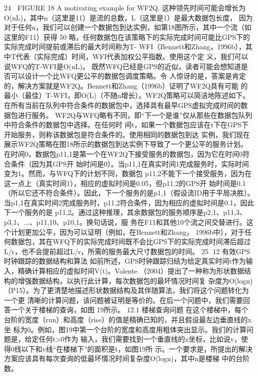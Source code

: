                                                                   24
                     FIGURE 18 A motivating example for WF2Q.
这种领先时间可能会增长为O(nL)，其中n（这里是11）是流的总数，L（这里是1）是最大数据包长度，
因为对于任何n，我们可以创建一个数据包到达实例，如第18图所示，其中一个流（如这里的F11）获得
50%
略，任何数据包在该策略下的实际完成时间可能比GPS下的实际完成时间提前或滞后的最大时间称为T-
WFI（Bennett和Zhang，1996b），其中T代表（实际完成）时间，WFI代表加权公平指数。使用这个定
义，我们可以说WFQ的T-WFI是O(nL)。
既然WFQ已经是GPS的近似，读者可能会想知道是否可以设计一个比WFQ更公平的数据包调度策略。令
人惊讶的是，答案是肯定的，解决方案就是WF2Q。Bennett和Zhang（1996b）证明了WF2Q具有可能
的最小（最佳）T-WFI，即O(L)（不随n增长）。WF2Q策略可以简洁地陈述如下。
在所有当前在队列中符合条件的数据包中，选择具有最早GPS虚拟完成时间的数据包进行服务。
WF2Q与WFQ略有不同，即“下一个是谁”仅从那些在数据包队列中符合条件的数据包中选择。在任何时
间t，如果一个数据包应该在t下在GPS下开始服务，则称该数据包是符合条件的。使用相同的数据包到达
实例，我们现在展示WF2Q策略在图18所示的数据包到达实例下导致了一个更公平的服务计划。
在时间0，数据包p11,1是第一个在WF2Q下接受服务的数据包，因为它在时间0符合条件（因为其GPS开
始时间是0）。当p11,1在真实时间1完成服务时，实际时间变为1。然而，与WFQ下的计划不同，数据包
p11,2不能下一个接受服务，因为在这一点上（真实时间1），相应的虚拟时间是0.05，但p11,2的GPS开
始时间是0.1（所以它还不符合条件）。因此，下一个服务的是p1,1（假设流ID用于平局决胜）。
当p1,1在真实时间2完成服务时，p11,2符合条件，因为相应的虚拟时间是0.1，因此下一个服务的是
p11,2。通过这种推理，其余数据包的服务顺序是p2,1、p11,3、p3,1、...、p11,10、p10,1。换句话说，服
务在F11和其他10个流之间交替进行。这个计划更加公平，因为可以证明（例如，在Bennett和Zhang，
1996b中），对于任何数据包，其在WFQ下的实际完成时间既不会比GPS下的实际完成时间滞后超过
L/r，也不会提前超过L/r，所需的服务最大尺寸数据包的时间。
                                                             25
12 有效GPS时钟跟踪的数据结构和算法
如前所述，GPS时钟跟踪归结为给定真实时间t作为输入，精确计算相应的虚拟时间V(t)。Valente
（2004）提出了一种称为形状数据结构的增强数据结构，以执行此计算，每次数据包的最坏情况时间复
杂度为O(logn)（P15）。为了更清楚地描述形状数据结构及其伴随算法，我们将这个问题转化为一个更
清晰的计算问题，该问题被证明是等价的。在后一个问题中，我们需要回答一个关于楼梯的查询，如图
19所示。
12.1 楼梯查询问题
在这个楼梯中，每个台阶的宽度（run）和高度（rise）的值是精确已知的，并且假设最左边垂直线的x坐
标为0。例如，图19中第一个台阶的宽度和高度用粗体突出显示。我们的计算问题是，给定任何t>0作为
输入，我们需要找到一个垂直线的x坐标，比如说v，使得0线以下和v线“在楼梯下”的面积是t，如图19所
示。一个要求是，所提出的解决方案应该具有每次查询的低最坏情况时间复杂度O(logn)，其中n是楼梯
中的台阶数。




